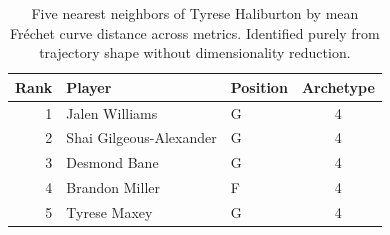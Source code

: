 \begin{table}[htbp]
  \centering\small
  \begin{tabular}{rllc}
    \toprule
    Rank & Player & Position & Archetype \\
    \midrule
    1 & Jalen Williams & G & 4 \\
    2 & Shai Gilgeous-Alexander & G & 4 \\
    3 & Desmond Bane & G & 4 \\
    4 & Brandon Miller & F & 4 \\
    5 & Tyrese Maxey & G & 4 \\
    \bottomrule
  \end{tabular}
  \caption{Five nearest neighbors of Tyrese Haliburton by mean Fr\'{e}chet curve distance across metrics. Identified purely from trajectory shape without dimensionality reduction.}
  \label{tab:Tyrese_Haliburton_frechet_curve_neighbors}
\end{table}

